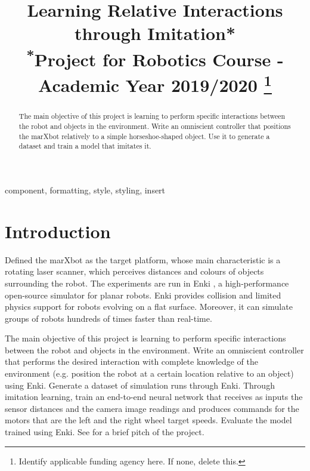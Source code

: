 \documentclass[conference]{IEEEtran}
\begin{document}
\title{Learning Relative Interactions through Imitation*\\
{\footnotesize \textsuperscript{*}Project for Robotics Course - Academic Year 2019/2020
}
\thanks{Identify applicable funding agency here. If none, delete this.}
}

\author{
\and
{}
}

\maketitle

\begin{abstract}
The main objective of this project is learning to perform specific interactions between the robot and objects in the 
environment.
Write an omniscient controller that positions the marXbot relatively to a simple horseshoe-shaped object. Use it to 
generate a dataset and train a model that imitates it.
\end{abstract}

\begin{IEEEkeywords}
component, formatting, style, styling, insert
\end{IEEEkeywords}

\section{Introduction}
Defined the marXbot \cite{bonani2010marxbot} as the target platform, whose main characteristic is a rotating laser 
scanner, which perceives distances and colours of objects surrounding the robot. The experiments are run in Enki  
\cite{enki}, a high-performance open-source simulator for planar robots. Enki provides collision and limited physics 
support for robots evolving on a flat surface. 
Moreover, it can simulate groups of robots hundreds of times faster than real-time.

The main objective of this project is learning to perform specific interactions between the robot and objects in the 
environment.
Write an omniscient controller that performs the desired interaction with complete knowledge of the environment (e.g. 
position the robot at a certain location relative to an object) using Enki.
Generate a dataset of simulation runs through Enki. 
Through imitation learning, train an end-to-end neural network that receives as inputs the sensor distances and the 
camera image readings and produces commands for the motors that are the left and the right wheel target speeds.
Evaluate the model trained using Enki.
See \cite{pitch} for a brief pitch of the project. 
\end{document}

